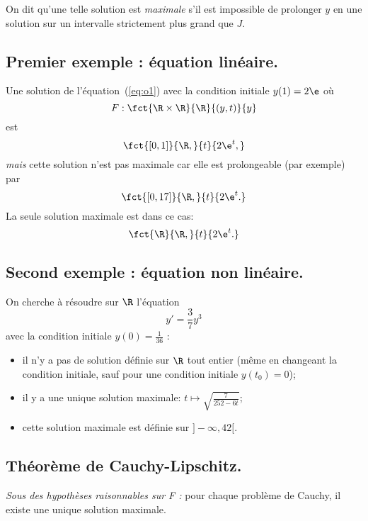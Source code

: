 On dit qu'une telle solution est \emph{maximale} s'il est
impossible de prolonger $y$ en une solution sur un intervalle strictement
plus grand que $J$.
\clearslide{}

\subsection{Premier exemple : équation linéaire.}
Une solution de l'équation~(\ref{eq:o1}) avec la condition initiale $y(1)=2
\e$ où
\begin{equation*}
  F:\fct{\R\times \R}{\R}{(y,t)}{y}
\end{equation*}
est
\begin{equation*}
  \fct{[0,1]}{\R,}{t}{2 \e^{t},}
\end{equation*}
\emph{mais} cette solution n'est pas maximale car elle est prolongeable (par exemple) par
\begin{equation*}
  \fct{[0,17]}{\R,}{t}{2 \e^{t}.}
\end{equation*}
La seule solution maximale est dans ce cas:
\begin{equation*}
  \fct{\R}{\R,}{t}{2\e^{t}.}
\end{equation*}
\clearslide{}

\subsection{Second exemple : équation non linéaire.}

On cherche à résoudre sur $\R$ l'équation
\begin{equation*}
  y' = \frac{3}{7}y^{3}
\end{equation*}
avec la condition initiale $y(0)=\frac{1}{36}$ :

\begin{itemize}
\item il n'y a pas de solution définie sur $\R$ tout entier (même en
  changeant la condition initiale, sauf pour une condition initiale $y(t_{0})=0$);
\item il y a une unique solution maximale: $t\mapsto\sqrt{\frac{7}{252 - 6t}}$;
\item cette solution maximale est définie sur $]-\infty, 42[$.
\end{itemize}
\clearslide{}
\subsection{Théorème de Cauchy-Lipschitz.}

\emph{Sous des hypothèses raisonnables sur F :} pour chaque problème de Cauchy, il existe une unique solution
maximale.

